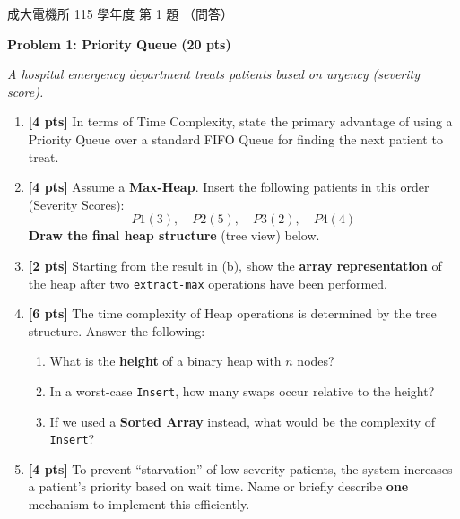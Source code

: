 \begin{pastexam}[label={px:ncku-115-ee-ds-01}]{成大電機所 115 學年度 第 1 題}
（問答）

\textbf{Problem 1: Priority Queue (20 pts)}

\textit{A hospital emergency department treats patients based on urgency (severity score).}
\begin{enumerate}[label=(\alph*)]
\item \textbf{[4 pts]} In terms of Time Complexity, state the primary advantage of using a Priority
Queue over a standard FIFO Queue for finding the next patient to treat.
\item \textbf{[4 pts]} Assume a \textbf{Max-Heap}. Insert the following patients in this order
(Severity Scores):
\[ P1(3),\quad P2(5),\quad P3(2),\quad P4(4) \]
\textbf{Draw the final heap structure} (tree view) below.
\item \textbf{[2 pts]} Starting from the result in (b), show the \textbf{array representation} of the
heap after two \texttt{extract-max} operations have been performed.
\item \textbf{[6 pts]} The time complexity of Heap operations is determined by the tree structure.
Answer the following:
\begin{enumerate}[label=\arabic*.]
\item What is the \textbf{height} of a binary heap with $n$ nodes?
\item In a worst-case \texttt{Insert}, how many swaps occur relative to the height?
\item If we used a \textbf{Sorted Array} instead, what would be the complexity of \texttt{Insert}?
\end{enumerate}
\item \textbf{[4 pts]} To prevent ``starvation'' of low-severity patients, the system increases a
patient's priority based on wait time. Name or briefly describe \textbf{one} mechanism to implement
this efficiently.
\end{enumerate}
\end{pastexam}

